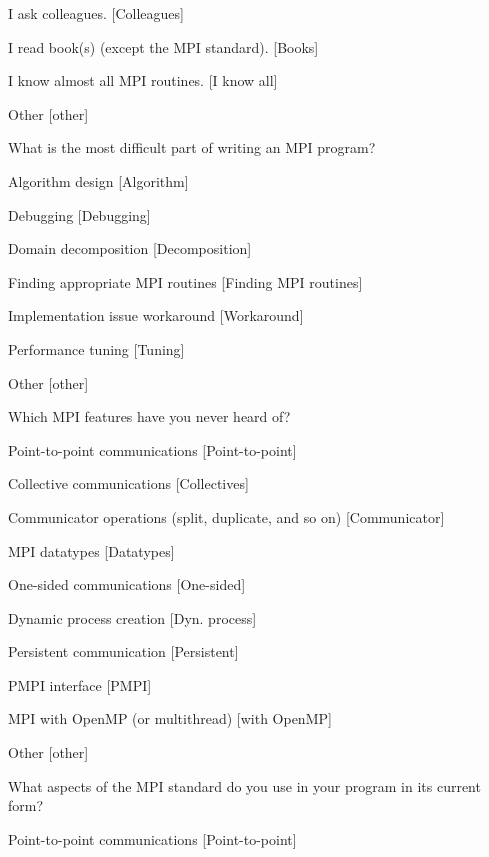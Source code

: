 \documentclass[conference,10pt,letterpaper]{IEEEtran}
\begin{document}
{{\begin{description}
\begin{inparaenum}[{\bf C}1)]
    \item I ask colleagues. [Colleagues]
    \item I read book(s) (except the MPI standard). [Books]
    \item I know almost all MPI routines. [I know all]
    \item Other [other]
    \end{inparaenum}
  \item[Q15:] What is the most difficult part of writing an MPI program?
    \begin{inparaenum}[{\bf C}1)]
    \item Algorithm design [Algorithm]
    \item Debugging [Debugging]
    \item Domain decomposition [Decomposition]
    \item Finding appropriate MPI routines [Finding MPI routines]
    \item Implementation issue workaround [Workaround]
    \item Performance tuning [Tuning]
    \item Other [other]
    \end{inparaenum}
  \item[Q16*:] Which MPI features have you never heard of?
    \begin{inparaenum}[{\bf C}1)]
    \item Point-to-point communications [Point-to-point]
    \item Collective communications [Collectives]
    \item Communicator operations (split, duplicate, and so on) [Communicator]
    \item MPI datatypes [Datatypes]
    \item One-sided communications [One-sided]
    \item Dynamic process creation [Dyn. process]
    \item Persistent communication [Persistent]
    \item PMPI interface [PMPI]
    \item MPI with OpenMP (or multithread) [with OpenMP]
    \item Other [other]
    \end{inparaenum}
  \item[Q17*:] What aspects of the MPI standard do you use in your program in its current form?
    \begin{inparaenum}[{\bf C}1)]
    \item Point-to-point communications [Point-to-point]

\end{inparaenum}
\end{description}}}
\end{document}
